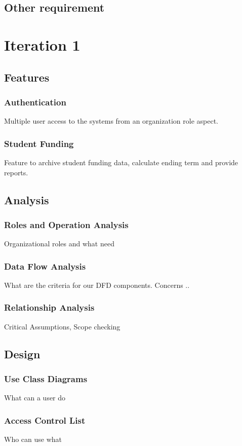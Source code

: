 \documentclass{journal}
\begin{document}
\begin{description}[style=multiline,leftmargin=3cm,font=\normalfont]
\subsection{Other requirement}

\newpage

\section{Iteration 1}
\subsection{Features}
\subsubsection{Authentication}
Multiple user access to the systems from an organization role aspect.
\subsubsection{Student Funding}
Feature to archive student funding data, calculate ending term and provide reports.
\subsection{Analysis}
\subsubsection{Roles and Operation Analysis}
Organizational roles and what need 
\subsubsection{Data Flow Analysis}
What are the criteria for our DFD components. Concerns .. 
\subsubsection{Relationship Analysis}
Critical Assumptions, Scope checking
\subsection{Design}
\subsubsection{Use Class Diagrams}
What can a user do
\subsubsection{Access Control List}
Who can use what

\end{description}
\end{document}
